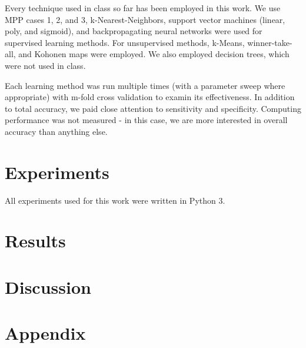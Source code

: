 \documentclass[letter,11pt,titlepage]{article}
\begin{document}
Every technique used in class so far has been employed in this work. We use MPP cases 1, 2, and 3, k-Nearest-Neighbors, support vector machines (linear, poly, and sigmoid), and backpropagating neural networks were used for supervised learning methods. For unsupervised methods, k-Means, winner-take-all, and Kohonen maps were employed. We also employed decision trees, which were not used in class.

Each learning method was run multiple times (with a parameter sweep where appropriate) with m-fold cross validation to examin its effectiveness. In addition to total accuracy, we paid close attention to sensitivity and specificity. Computing performance was not measured - in this case, we are more interested in overall accuracy than anything else.

\section{Experiments}

All experiments used for this work were written in Python 3. 

\section{Results}

\section{Discussion}

\section{Appendix}

\clearpage


\end{document}
